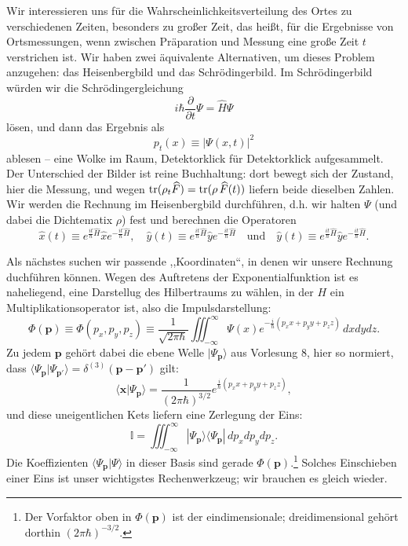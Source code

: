 Wir interessieren uns für die Wahrscheinlichkeitsverteilung des Ortes zu verschiedenen Zeiten, besonders zu großer Zeit, das heißt, für die Ergebnisse von
Ortsmessungen, wenn zwischen Präparation und Messung eine große Zeit $t$ verstrichen ist. Wir haben zwei äquivalente Alternativen, um dieses Problem anzugehen: das Heisenbergbild und das Schrödingerbild. Im Schrödingerbild würden wir die Schrödingergleichung 
\begin{equation}
	i\hbar \frac{\partial}{\partial t}\Psi = \widehat{H}\Psi
\end{equation}
lösen, und dann das Ergebnis als 
\begin{equation}
	p_t(x) \equiv |\Psi(x,t)|^2
\end{equation}
ablesen -- eine Wolke im Raum, Detektorklick für Detektorklick aufgesammelt. Der Unterschied der Bilder ist reine Buchhaltung: dort bewegt sich der Zustand, hier die Messung, und wegen $\operatorname{tr}(\rho_t\widehat{F}) = \operatorname{tr}(\rho\,\widehat{F}(t))$ liefern beide dieselben Zahlen. Wir werden die Rechnung im Heisenbergbild durchführen, d.h. wir halten $\Psi$ (und dabei
die Dichtematix $\rho$) fest und berechnen die Operatoren
\begin{equation}
	\widehat{x}(t) \equiv e^{\frac{it}{\hbar} \widehat{H}}\widehat{x} e^{-\frac{it}{\hbar} \widehat{H}}, \quad \widehat{y}(t) \equiv e^{\frac{it}{\hbar} \widehat{H}}\widehat{y} e^{-\frac{it}{\hbar} \widehat{H}} \quad \text{und} \quad \widehat{y}(t) \equiv e^{\frac{it}{\hbar} \widehat{H}}\widehat{y} e^{-\frac{it}{\hbar} \widehat{H}}.
\end{equation}

Als nächstes suchen wir passende ,,Koordinaten``, in denen wir unsere Rechnung duchführen können. Wegen des Auftretens der Exponentialfunktion ist es naheliegend, eine Darstellug des Hilbertraums zu wählen, in der $H$ ein Multiplikationsoperator ist, also die Impulsdarstellung:
\begin{equation}
	\Phi(\mathbf{p})\equiv \Phi(p_x,p_y,p_z) \equiv \frac{1}{\sqrt{2\pi\hbar}} \iiint_{-\infty}^\infty \Psi(x)e^{-\frac{i}{\hbar}(p_x x+ p_y y+ p_z z)}\,dxdydz.	
\end{equation} 
Zu jedem $\mathbf{p}$ gehört dabei die ebene Welle $|\Psi_{\mathbf{p}}\rangle$ aus Vorlesung 8, hier so normiert, dass $\langle\Psi_{\mathbf{p}}|\Psi_{\mathbf{p}'}\rangle = \delta^{(3)}(\mathbf{p}-\mathbf{p}')$ gilt:
\begin{equation}
	\langle \mathbf{x}|\Psi_{\mathbf{p}}\rangle = \frac{1}{(2\pi\hbar)^{3/2}}e^{\frac{i}{\hbar}(p_x x + p_y y + p_z z)},
\end{equation}
und diese uneigentlichen Kets liefern eine Zerlegung der Eins:
\begin{equation}\label{eq:eins-impuls}
	\mathbb{I} = \iiint_{-\infty}^\infty |\Psi_{\mathbf{p}}\rangle\langle\Psi_{\mathbf{p}}|\,dp_xdp_ydp_z.
\end{equation}
Die Koeffizienten $\langle\Psi_{\mathbf{p}}|\Psi\rangle$ in dieser Basis sind gerade $\Phi(\mathbf{p})$.\footnote{Der Vorfaktor oben in $\Phi(\mathbf{p})$ ist der eindimensionale; dreidimensional gehört dorthin $(2\pi\hbar)^{-3/2}$.} Solches Einschieben einer Eins ist unser wichtigstes Rechenwerkzeug; wir brauchen es gleich wieder.

